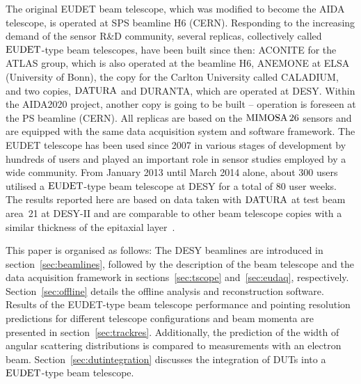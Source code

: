 The original EUDET beam telescope, which was modified to become the AIDA telescope, is operated at SPS beamline H6 (CERN).
Responding to the increasing demand of the sensor R\&D community, several replicas, collectively called $\textrm{EUDET}$-type beam telescopes, have been built since then:
 ACONITE for the ATLAS group, which is also operated at the beamline H6, ANEMONE at ELSA (University of Bonn), the copy for the Carlton University called CALADIUM, 
 and two copies, $\textrm{DATURA}$ and DURANTA, which are operated at DESY. 
 Within the AIDA2020 project, another copy is going to be built -- operation is foreseen at the PS beamline (CERN).
All replicas are based on the $\textrm{MIMOSA\,26}$ sensors and are equipped with the same data acquisition system and software framework. 
The EUDET telescope has been used since 2007 in various stages of development by hundreds of users and played an important role in sensor studies employed by a wide community. 
From January 2013 until March 2014 alone, about 300 users utilised a $\textrm{EUDET}$-type beam telescope at DESY for a total of 80 user weeks. 
The results reported here are based on data taken with $\textrm{DATURA}$ at test beam area~21 at {DESY-II} and are comparable to other beam telescope copies with
a similar thickness of the epitaxial layer~\cite{desy-tscopes-main}. 

This paper is organised as follows: 
The DESY beamlines are introduced in section~\ref{sec:beamlines}, followed by the description of the beam telescope
 and the data acquisition framework in sections~\ref{sec:tscope} and~\ref{sec:eudaq}, respectively.
Section~\ref{sec:offline} details the offline analysis and reconstruction software. 
Results of the EUDET-type beam telescope performance and pointing resolution predictions for different telescope configurations and beam momenta are presented in section~\ref{sec:trackres}. 
Additionally, the prediction of the width of angular scattering distributions is compared to measurements with an electron beam. 
Section~\ref{sec:dutintegration} discusses the integration of DUTs into a $\textrm{EUDET}$-type beam telescope. 
